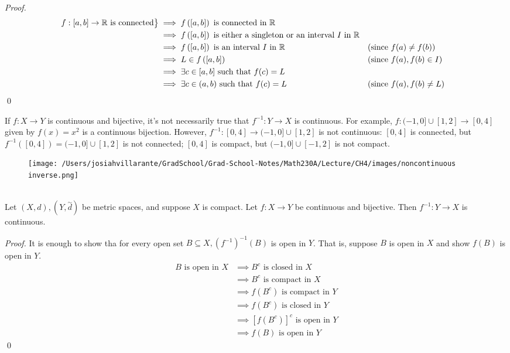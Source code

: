 \begin{proof}
\begin{align*}
    \begin{rcases*}
        f:[a,b] \to \R \text{ is connected} \\
    \end{rcases*}
    &\implies f\left([a,b]\right) \text{ is connected in } \R \\
    &\implies f\left([a,b]\right) \text{ is either a singleton or an interval $I$ in $\R$} \\
    &\implies f\left([a,b]\right) \text{ is an interval $I$ in $\R$} &&(\text{since } f(a) \not = f(b))\\
    &\implies L \in f\left([a,b]\right) &&(\text{since }f(a), f(b) \in I)\\
    &\implies \exists c \in [a,b] \st f(c) = L \\
    &\implies \exists c \in (a,b) \st f(c) = L &&(\text{since }f(a), f(b) \not = L)
\end{align*}
\qed
\end{proof}

\begin{note}
    If $f: X \to Y$ is continuous and bijective, it's not necessarily true that $f^{-1}: Y \to X$ is continuous. For example, $f: (-1,0]\cup [1,2] \to [0,4]$ given by $f(x) = x^2$ is a continuous bijection. However, $f^{-1}: [0,4] \to (-1, 0]\cup [1,2]$ is not continuous: $[0,4]$ is connected, but $f^{-1}\left([0,4]\right)=(-1,0]\cup[1,2]$ is not connected; $[0,4]$ is compact, but $(-1,0]\cup[-1,2]$ is not compact.
\end{note}

\begin{figure}[h]
    \texttt{[image: /Users/josiahvillarante/GradSchool/Grad-School-Notes/Math230A/Lecture/CH4/images/noncontinuous inverse.png]}
\end{figure}

\begin{theorem} \leavevmode \\
    \label{thm4.17}
    Let $(X,d), (Y, \overset{\sim}{d})$ be metric spaces, and suppose $X$ is compact. Let $f:X \to Y$ be continuous and bijective. Then $f^{-1}:Y \to X$ is continuous.
\end{theorem}

\begin{proof}
    It is enough to show tha for every open set $B \subseteq X, (f^{-1})^{-1}(B)$ is open in $Y$. That is, suppose $B$ is open in $X$ and show $f(B)$ is open in $Y$.
    \begin{align*}
        \text{$B$ is open in $X$} &\implies \text{$B^c$ is closed in $X$} \\
        &\implies \text{$B^c$ is compact in $X$} \\
        &\implies \text{$f(B^c)$ is compact in $Y$} \\
        &\implies \text{$f(B^c)$ is closed in $Y$} \\
        &\implies \text{$[f(B^c)]^c$ is open in $Y$} \\
        &\implies \text{$f(B)$ is open in $Y$}
    \end{align*}
    \qed
\end{proof}